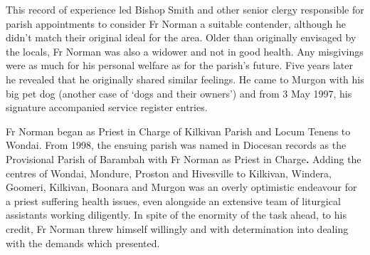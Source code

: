 This record of experience led Bishop Smith and other senior clergy responsible for parish appointments to consider Fr Norman a suitable contender, although he didn't match their original ideal for the area. Older than originally envisaged by the locals, Fr Norman was also a widower and not in good health. Any misgivings were as much for his personal welfare as for the parish's future. Five years later he revealed that he originally shared similar feelings. He came to Murgon with his big pet dog (another case of `dogs and their owners') and from 3 May 1997, his signature accompanied service register entries.



Fr Norman began as Priest in Charge of Kilkivan Parish and Locum Tenens to Wondai. From 1998, the ensuing parish was named in Diocesan records as the Provisional Parish of Barambah with Fr Norman as Priest in Charge\textbf{.} Adding the centres of Wondai, Mondure, Proston and Hivesville to Kilkivan, Windera, Goomeri, Kilkivan, Boonara and Murgon was an overly optimistic endeavour for a priest suffering health issues, even alongside an extensive team of liturgical assistants working diligently. In spite of the enormity of the task ahead, to his credit, Fr Norman threw himself willingly and with determination into dealing with the demands which presented.









